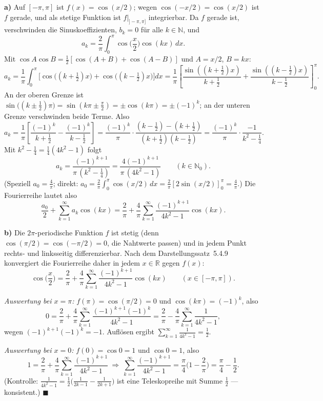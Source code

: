 \documentclass[a4paper,12pt]{article}
\providecommand{\qed}{\hfill\ensuremath{\blacksquare}}
\begin{document}
\textbf{a)} Auf $[-\pi,\pi]$ ist $f(x)=\cos(x/2)$; wegen $\cos(-x/2)=\cos(x/2)$ ist $f$ gerade, und als stetige Funktion ist $f|_{]-\pi,\pi]}$ integrierbar. Da $f$ gerade ist, verschwinden die Sinuskoeffizienten, $b_k=0$ für alle $k\in\mathbb{N}$, und
\[ a_k=\frac{2}{\pi}\int_0^\pi \cos\!\Big(\frac{x}{2}\Big)\cos(kx)\,dx. \]
Mit $\cos A\cos B=\tfrac12[\cos(A+B)+\cos(A-B)]$ und $A=x/2$, $B=kx$:
\[ a_k=\frac{1}{\pi}\int_0^\pi\Big[\cos\!\big((k+\tfrac12)x\big)+\cos\!\big((k-\tfrac12)x\big)\Big]dx
   = \frac{1}{\pi}\left[\frac{\sin((k+\frac12)x)}{k+\frac12}+\frac{\sin((k-\frac12)x)}{k-\frac12}\right]_0^\pi. \]
An der oberen Grenze ist $\sin\!\big((k\pm\tfrac12)\pi\big)=\sin(k\pi\pm\tfrac{\pi}{2})=\pm\cos(k\pi)=\pm(-1)^k$; an der unteren Grenze verschwinden beide Terme. Also
\[ a_k=\frac{1}{\pi}\left[\frac{(-1)^k}{k+\frac12}-\frac{(-1)^k}{k-\frac12}\right]
   = \frac{(-1)^k}{\pi}\cdot\frac{(k-\frac12)-(k+\frac12)}{(k+\frac12)(k-\frac12)}
   = \frac{(-1)^k}{\pi}\cdot\frac{-1}{k^2-\frac14}. \]
Mit $k^2-\tfrac14=\tfrac14(4k^2-1)$ folgt
\[ a_k=\frac{(-1)^{k+1}}{\pi\,(k^2-\frac14)}=\frac{4(-1)^{k+1}}{\pi\,(4k^2-1)}\qquad(k\in\mathbb{N}_0). \]
(Speziell $a_0=\tfrac{4}{\pi}$; direkt: $a_0=\tfrac{2}{\pi}\int_0^\pi\cos(x/2)\,dx=\tfrac{2}{\pi}[2\sin(x/2)]_0^\pi=\tfrac{4}{\pi}$.) Die Fourierreihe lautet also
\[ \frac{a_0}{2}+\sum_{k=1}^\infty a_k\cos(kx)=\frac{2}{\pi}+\frac{4}{\pi}\sum_{k=1}^\infty \frac{(-1)^{k+1}}{4k^2-1}\cos(kx). \]

\textbf{b)} Die $2\pi$-periodische Funktion $f$ ist stetig (denn $\cos(\pi/2)=\cos(-\pi/2)=0$, die Nahtwerte passen) und in jedem Punkt rechts- und linksseitig differenzierbar. Nach dem Darstellungssatz~5.4.9 konvergiert die Fourierreihe daher in jedem $x\in\mathbb{R}$ gegen $f(x)$:
\[ \cos\!\Big(\frac{x}{2}\Big)=\frac{2}{\pi}+\frac{4}{\pi}\sum_{k=1}^\infty\frac{(-1)^{k+1}}{4k^2-1}\cos(kx)\qquad(x\in[-\pi,\pi]). \]

\emph{Auswertung bei $x=\pi$:} $f(\pi)=\cos(\pi/2)=0$ und $\cos(k\pi)=(-1)^k$, also
\[ 0=\frac{2}{\pi}+\frac{4}{\pi}\sum_{k=1}^\infty\frac{(-1)^{k+1}(-1)^k}{4k^2-1}
   = \frac{2}{\pi}-\frac{4}{\pi}\sum_{k=1}^\infty\frac{1}{4k^2-1}, \]
wegen $(-1)^{k+1}(-1)^k=-1$. Auflösen ergibt $\displaystyle\sum_{k=1}^\infty\frac{1}{4k^2-1}=\frac{1}{2}.$

\emph{Auswertung bei $x=0$:} $f(0)=\cos 0=1$ und $\cos 0=1$, also
\[ 1=\frac{2}{\pi}+\frac{4}{\pi}\sum_{k=1}^\infty\frac{(-1)^{k+1}}{4k^2-1}
   \ \Longrightarrow\ \sum_{k=1}^\infty\frac{(-1)^{k+1}}{4k^2-1}=\frac{\pi}{4}\Big(1-\frac{2}{\pi}\Big)=\frac{\pi}{4}-\frac{1}{2}. \]
(Kontrolle: $\frac{1}{4k^2-1}=\frac{1}{2}\big(\frac{1}{2k-1}-\frac{1}{2k+1}\big)$ ist eine Teleskopreihe mit Summe $\tfrac12$ --- konsistent.) \qed
\end{document}
